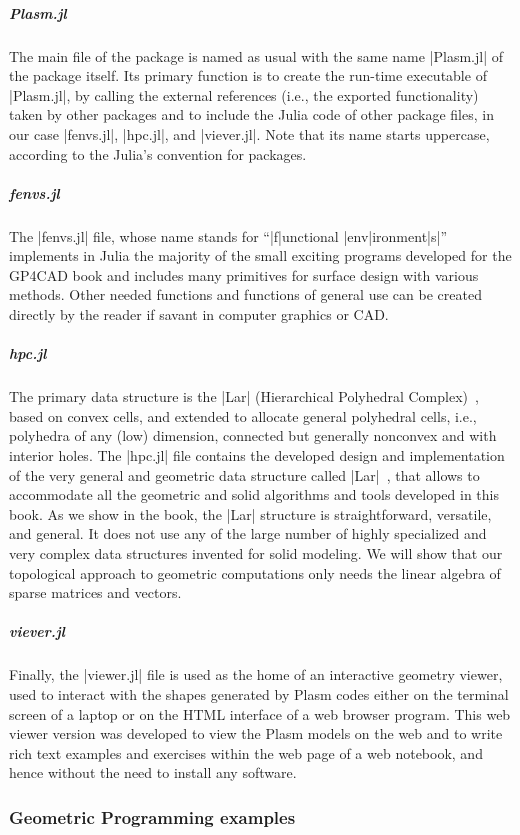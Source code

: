\subparagraph{Plasm.jl}
The main file of the package is named as usual with the same name |Plasm.jl| of the package itself. Its primary function is to create the run-time executable of |Plasm.jl|, by calling the external references (i.e., the exported functionality) taken by other packages and to include the Julia code of other package files, in our case |fenvs.jl|, |hpc.jl|, and |viever.jl|. Note that its name starts uppercase, according to the Julia’s convention for packages.

\subparagraph{fenvs.jl}
The |fenvs.jl| file, whose name stands for “|f|unctional |env|ironment|s|” implements in Julia the majority of the small exciting programs developed for the GP4CAD book and includes many primitives for surface design with various methods. Other needed functions and functions of general use can be created directly by the reader if savant in computer graphics or CAD.

\subparagraph{hpc.jl}
The primary data structure is the |Lar| (Hierarchical Polyhedral Complex)~\cite{}, based on convex cells, and extended to allocate general polyhedral cells, i.e., polyhedra of any (low) dimension, connected but generally nonconvex and with interior holes. 
The |hpc.jl| file contains the developed design and implementation of the very general and   geometric data structure called |Lar|~\cite{}, that allows to accommodate all the geometric and solid algorithms and tools developed in this book. As we show in the book, the |Lar| structure is straightforward, versatile, and general. It does not use any of the large number of highly specialized and very complex data structures invented for solid modeling. We will show that our topological approach to geometric computations only needs the linear algebra of sparse matrices and vectors.

\subparagraph{viever.jl}
Finally, the |viewer.jl| file is used as the home of an interactive geometry viewer, used to interact with the shapes generated by Plasm codes either on the terminal screen of a laptop or on the HTML interface of a web browser program. This web viewer version was developed to view the Plasm models on the web and to write rich text examples and exercises within the web page of a web notebook, and hence without the need to install any software.





\subsubsection*{Geometric Programming examples}

